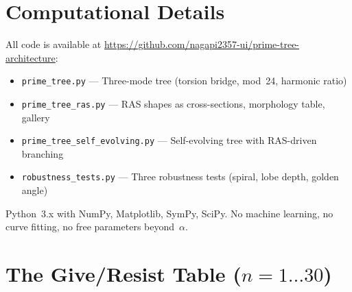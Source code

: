 \documentclass[11pt,a4paper]{article}
\begin{document}
\newpage
\appendix

\section{Computational Details}

All code is available at \url{https://github.com/nagapi2357-ui/prime-tree-architecture}:
\begin{itemize}[nosep]
    \item \texttt{prime\_tree.py} --- Three-mode tree (torsion bridge, mod~24, harmonic ratio)
    \item \texttt{prime\_tree\_ras.py} --- RAS shapes as cross-sections, morphology table, gallery
    \item \texttt{prime\_tree\_self\_evolving.py} --- Self-evolving tree with RAS-driven branching
    \item \texttt{robustness\_tests.py} --- Three robustness tests (spiral, lobe depth, golden angle)
\end{itemize}

Python~3.x with NumPy, Matplotlib, SymPy, SciPy. No machine learning, no curve fitting, no free parameters beyond~$\alpha$.

\section{The Give/Resist Table ($n = 1\ldots30$)}
\end{document}

